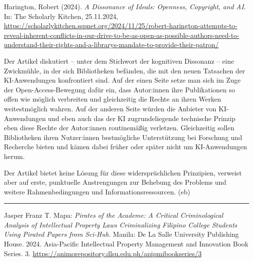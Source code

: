 \documentclass[a4paper,
fontsize=11pt,
oneside,
numbers=noperiodatend,
parskip=half-,
bibliography=totoc,
final
]{scrartcl}
\begin{document}
Harington, Robert (2024). \emph{A Dissonance of Ideals: Openness,
Copyright, and AI}. In: The Scholarly Kitchen, 25.11.2024,
\url{https://scholarlykitchen.sspnet.org/2024/11/25/robert-harington-attempts-to-reveal-inherent-conflicts-in-our-drive-to-be-as-open-as-possible-authors-need-to-understand-their-rights-and-a-librarys-mandate-to-provide-their-patron/}

Der Artikel diskutiert -- unter dem Stichwort der kognitiven Dissonanz
-- eine Zwickmühle, in der sich Bibliotheken befänden, die mit den neuen
Tatsachen der KI-Anwendungen konfrontiert sind. Auf der einen Seite
setze man sich im Zuge der Open-Access-Bewegung dafür ein, dass
Autor:innen ihre Publikationen so offen wie möglich verbreiten und
gleichzeitig die Rechte an ihren Werken weitestmöglich wahren. Auf der
anderen Seite würden die Anbieter von KI-Anwendungen und eben auch das
der KI zugrundeliegende technische Prinzip eben diese Rechte der
Autor:innen routinemäßig verletzen. Gleichzeitig sollen Bibliotheken
ihren Nutzer:innen bestmögliche Unterstützung bei Forschung und
Recherche bieten und kämen dabei früher oder später nicht um
KI-Anwendungen herum.

Der Artikel bietet keine Lösung für diese widersprüchlichen Prinzipien,
verweist aber auf erste, punktuelle Anstrengungen zur Behebung des
Problems und weitere Rahmenbedingungen und Informationsressourcen. (eb)

\begin{center}\rule{0.5\linewidth}{0.5pt}\end{center}

Jasper Franz T. Mapa: \emph{Pirates of the Academe: A Critical
Criminological Analysis of Intellectual Property Laws Criminalizing
Filipino College Students Using Pirated Papers from Sci-Hub.} Manila: De
La Salle University Publishing House. 2024. Asia-Pacific Intellectual
Property Management and Innovation Book Series. 3.
\url{https://animorepository.dlsu.edu.ph/apipmibookseries/3}
\end{document}
